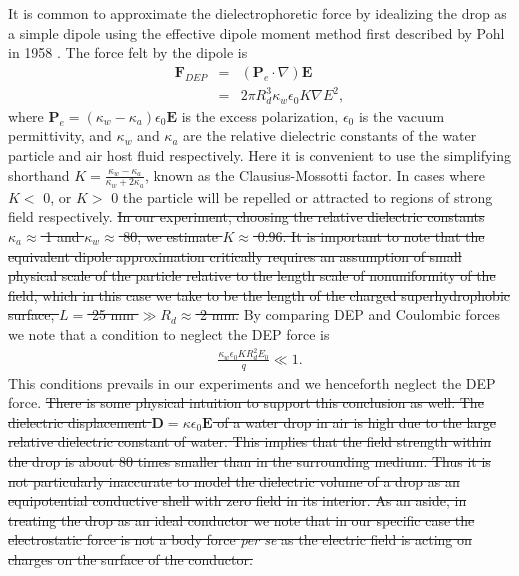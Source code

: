 \documentclass[aip,reprint, floatfix]{revtex4-1}
\begin{document}
It is common to approximate the dielectrophoretic force by idealizing the drop as a simple dipole using the effective dipole moment method first described by Pohl in 1958 \cite{pohl_effects_1958}. The force felt by the dipole is 
\begin{eqnarray} \label{dep_force}
\mathbf{F}_{DEP} &=& \left( \mathbf{P}_e \cdot \nabla \right) \mathbf{E} \nonumber \\
&=& 2 \pi R_d^3 \kappa_w \epsilon_0 K \nabla E^2,
\end{eqnarray}
where $\mathbf{P}_e=(\kappa_w - \kappa_a)\epsilon_0 \mathbf{E}$ is the excess polarization, $\epsilon_0$ is the vacuum permittivity, and $\kappa_w$ and $\kappa_a$ are the relative dielectric constants of the water particle and air host fluid respectively. Here it is convenient to use the simplifying shorthand $K = \frac{\kappa_w - \kappa_a}{\kappa_w + 2 \kappa_a}$, known as the Clausius-Mossotti factor. In cases where $K <$ 0, or $K>$ 0 the particle will be repelled or attracted to regions of strong field respectively. \sout{In our experiment, choosing the relative dielectric constants $\kappa_a \approx$ 1 and $\kappa_w \approx$ 80, we estimate $K \approx$ 0.96. It is important to note that the equivalent dipole approximation critically requires an assumption of small physical scale of the particle relative to the length scale of nonuniformity of the field, which in this case we take to be the length of the charged superhydrophobic surface, $L =$ 25 mm $\gg R_d \approx$ 2 mm.} By comparing DEP and Coulombic forces we note that a condition to neglect the DEP force is
\begin{eqnarray}
\frac{ \kappa_w \epsilon_0 K R_d^2 E_0}{q} \ll 1. \nonumber
\end{eqnarray}
This conditions prevails in our experiments and we henceforth neglect the DEP force. \sout{There is some physical intuition to support this conclusion as well. The dielectric displacement $\mathbf{D} = \kappa \epsilon_0 \mathbf{E}$ of a water drop in air is high due to the large relative dielectric constant of water. This implies that the field strength within the drop is about 80 times smaller than in the surrounding medium. Thus it is not particularly inaccurate to model the dielectric volume of a drop as an equipotential conductive shell with zero field in its interior. As an aside, in treating the drop as an ideal conductor we note that in our specific case the electrostatic force is not a body force \emph{per se} as the electric field is acting on charges on the surface of the conductor.}
\end{document}
